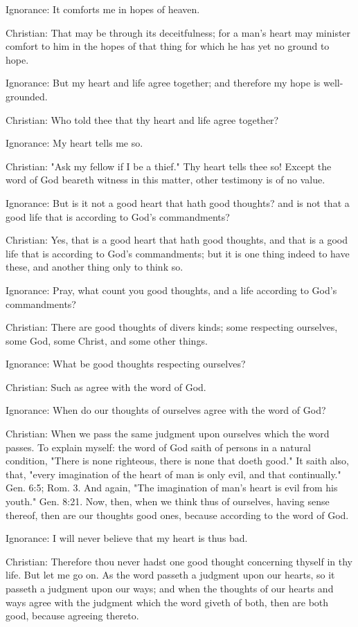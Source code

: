 Ignorance: It comforts me in hopes of heaven.

Christian: That may be through its deceitfulness; for a man's heart may
minister comfort to him in the hopes of that thing for which he has yet
no ground to hope.

Ignorance: But my heart and life agree together; and therefore my hope
is well-grounded.

Christian: Who told thee that thy heart and life agree together?

Ignorance: My heart tells me so.

Christian: "Ask my fellow if I be a thief." Thy heart tells thee so!
Except the word of God beareth witness in this matter, other testimony
is of no value.

Ignorance: But is it not a good heart that hath good thoughts? and is
not that a good life that is according to God's commandments?

Christian: Yes, that is a good heart that hath good thoughts, and that
is a good life that is according to God's commandments; but it is one
thing indeed to have these, and another thing only to think so.

Ignorance: Pray, what count you good thoughts, and a life according to
God's commandments?

Christian: There are good thoughts of divers kinds; some respecting
ourselves, some God, some Christ, and some other things.

Ignorance: What be good thoughts respecting ourselves?

Christian: Such as agree with the word of God.

Ignorance: When do our thoughts of ourselves agree with the word of
God?

Christian: When we pass the same judgment upon ourselves which the word
passes. To explain myself: the word of God saith of persons in a
natural condition, "There is none righteous, there is none that doeth
good." It saith also, that, "every imagination of the heart of man is
only evil, and that continually." Gen. 6:5; Rom. 3. And again, "The
imagination of man's heart is evil from his youth." Gen. 8:21. Now,
then, when we think thus of ourselves, having sense thereof, then are
our thoughts good ones, because according to the word of God.

Ignorance: I will never believe that my heart is thus bad.

Christian: Therefore thou never hadst one good thought concerning
thyself in thy life. But let me go on. As the word passeth a judgment
upon our hearts, so it passeth a judgment upon our ways; and when the
thoughts of our hearts and ways agree with the judgment which the word
giveth of both, then are both good, because agreeing thereto.

